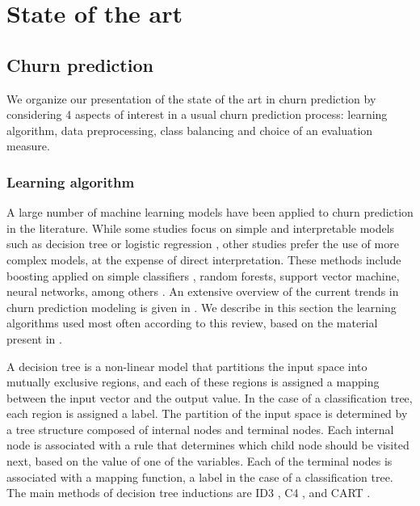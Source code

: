 \chapter{State of the art}
\label{ch:sota}

\section{Churn prediction}

We organize our presentation of the state of the art in churn prediction by
considering 4 aspects of interest in a usual churn prediction process: learning
algorithm, data preprocessing, class balancing and choice of an evaluation
measure.

\subsection{Learning algorithm}

A large number of machine learning models have been applied to churn prediction
in the literature. While some studies focus on simple and interpretable models
such as decision tree \parencite{keramati2014improved} or logistic regression
\parencite{olle2014hybrid}, other studies prefer the use of more complex models,
at the expense of direct interpretation. These methods include boosting applied
on simple classifiers \parencite{vafeiadis2015comparison}, random forests,
support vector machine, neural networks, among others
\parencite{umayaparvathi2016attribute, verbeke2012new}. An extensive overview of
the current trends in churn prediction modeling is given in
\parencite{kayaalp2017review}. We describe in this section the learning
algorithms used most often according to this review, based on the material
present in \parencite{bontempi2017handbook}.

A decision tree is a non-linear model that partitions the input space into
mutually exclusive regions, and each of these regions is assigned a mapping
between the input vector and the output value. In the case of a classification
tree, each region is assigned a label. The partition of the input space is
determined by a tree structure composed of internal nodes and terminal nodes.
Each internal node is associated with a rule that determines which child node
should be visited next, based on the value of one of the variables. Each of the
terminal nodes is associated with a mapping function,  a label in the case of a
classification tree. The main methods of decision tree inductions are ID3
\parencite{quinlan1986induction}, C4 \parencite{quinlan1987simplifying}, and
CART \parencite{breiman1984classification}.

